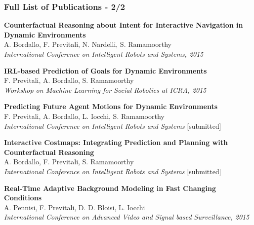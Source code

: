 \begin{frame}
	\frametitle{Full List of Publications - 2/2}
	
	\vspace{0.3cm}
	
	\scriptsize
	\textbf{Counterfactual Reasoning about Intent for Interactive Navigation in Dynamic Environments}\\
	A. Bordallo, F. Previtali, N. Nardelli, S. Ramamoorthy \\
	\emph{International Conference on Intelligent Robots and Systems, 2015} \\
	
	\vspace{0.15cm}
	
	\textbf{IRL-based Prediction of Goals for Dynamic Environments} \\
	F. Previtali, A. Bordallo, S. Ramamoorthy \\
	\emph{Workshop on Machine Learning for Social Robotics at ICRA, 2015} \\
	
	\vspace{0.15cm}
	
	\textbf{Predicting Future Agent Motions for Dynamic Environments} \\
	F. Previtali, A. Bordallo, L. Iocchi, S. Ramamoorthy \\
	\emph{International Conference on Intelligent Robots and Systems} [submitted] \\
	
	\vspace{0.15cm}
	
	\textbf{Interactive Costmaps: Integrating Prediction and Planning with Counterfactual Reasoning} \\
	A. Bordallo, F. Previtali, S. Ramamoorthy \\
	\emph{International Conference on Intelligent Robots and Systems} [submitted] \\
	
	\vspace{0.15cm}
	
	\textbf{Real-Time Adaptive Background Modeling in Fast Changing Conditions} \\
	A. Pennisi, F. Previtali, D. D. Bloisi, L. Iocchi \\
	\emph{International Conference on Advanced Video and Signal based Surveillance, 2015} \\
\end{frame}
